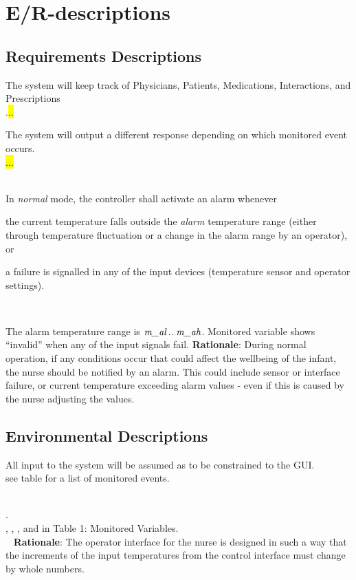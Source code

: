 \section{E/R-descriptions}

\subsection{Requirements Descriptions}
{The system will keep track of Physicians, Patients, Medications, Interactions, and Prescriptions\\}
{.\hl{..}}
\label{R1}

{The system will output a different response depending on which monitored event occurs. \\}
{\hl{...} \\~}
\label{R2}

{In \emph{normal} mode, the controller shall activate an alarm whenever 

\begin{mylist}
\item the current temperature falls outside the \emph{alarm} temperature range (either through temperature fluctuation or a change in the alarm range by an operator), or
\item a failure is signalled in any of the input devices (temperature sensor and operator settings).
\end{mylist}~}
{The alarm temperature range is $\textit{m\_al}\mathbin{.\mkern1mu.}\textit{m\_ah}$.
Monitored variable  
shows ``invalid'' when any of the input signals fail.}
\label{R3}
\noindent \textbf{Rationale}: During normal operation, if any conditions occur that could affect the wellbeing of the infant, the nurse should be notified by an alarm. This could include sensor or interface failure, or current temperature exceeding alarm values - even if this is caused by the nurse adjusting the values.

\subsection{Environmental Descriptions}
{All input to the system will be assumed as to be constrained to the GUI.\\}
{see table for a list of monitored events.\\~}
\label{E1}

{.\\}
{ , , , and  in Table 1: Monitored Variables.\\~}
\label{E2}
\noindent \textbf{Rationale}: The operator interface for the nurse is designed in such a way that the increments of the input temperatures from the control interface must change by whole numbers.

